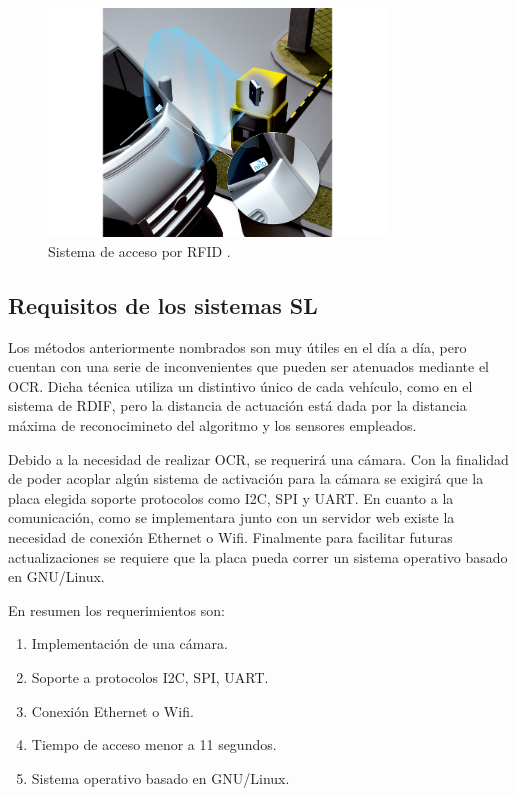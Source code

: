 \begin{figure}
    \centering
    \includegraphics[width=0.8\textwidth]{imgs/sistema-control-acceso-barreras-rfid.jpg}
    \caption{Sistema de acceso por RFID \cite{noauthor_acceso_nodate}.}
    \label{fig:sistema-moderno}
\end{figure}

\subsection{Requisitos de los sistemas SL}

Los métodos anteriormente nombrados son muy útiles en el día a día, pero cuentan con una serie de inconvenientes que pueden ser atenuados mediante el OCR.
Dicha técnica utiliza un distintivo único de cada vehículo, como en el sistema de RDIF, pero la distancia de actuación está dada por la distancia máxima de reconocimineto del algoritmo y los sensores empleados.

Debido a la necesidad de realizar OCR, se requerirá una cámara. Con la finalidad de poder acoplar algún sistema de activación para la cámara se exigirá que la placa elegida soporte protocolos como I2C, SPI y UART. En cuanto a la comunicación, como se implementara junto con un servidor web existe la necesidad de conexión Ethernet o Wifi. Finalmente para facilitar futuras actualizaciones se requiere que la placa pueda correr un sistema operativo basado en GNU/Linux.

En resumen los requerimientos son:

\begin{enumerate}
    \item Implementación de una cámara.
    \item Soporte a protocolos I2C, SPI, UART.
    \item Conexión Ethernet o Wifi.
    \item Tiempo de acceso menor a 11 segundos.
    \item Sistema operativo basado en GNU/Linux.
\end{enumerate}


